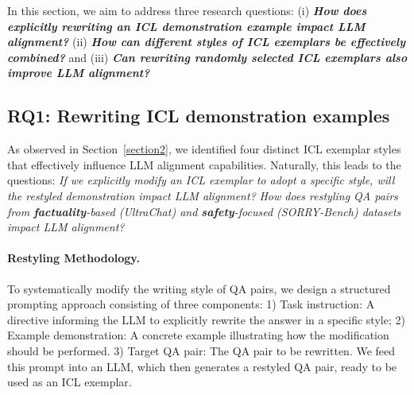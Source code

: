 

%
In this section, we aim to address three research questions: (i) \textbf{\textit{How does explicitly rewriting an ICL demonstration example impact LLM alignment?}} (ii) \textbf{\textit{How can different styles of ICL exemplars be effectively combined?}} and (iii) \textbf{\textit{Can rewriting randomly selected ICL exemplars also improve LLM alignment?}}

\subsection*{RQ1: Rewriting ICL demonstration examples}
\label{ssec:rewrtie_icl}
As observed in Section~\ref{section2}, we identified four distinct ICL exemplar styles that effectively influence LLM alignment capabilities.
Naturally, this leads to the questions: \emph{If we explicitly modify an ICL exemplar to adopt a specific style, will the restyled demonstration impact LLM alignment?}
\emph{How does restyling QA pairs from \textbf{\color{myblue} factuality}-based (UltraChat) and \textbf{\color{myred} safety}-focused (SORRY-Bench) datasets impact LLM alignment?}


\paragraph{Restyling Methodology.}
To systematically modify the writing style of QA pairs, we design a structured prompting approach consisting of three components: 1) Task instruction: A directive informing the LLM to explicitly rewrite the answer in a specific style; 2) Example demonstration: A concrete example illustrating how the modification should be performed. 3) Target QA pair: The QA pair to be rewritten.
We feed this prompt into an LLM, which then generates a restyled QA pair, ready to be used as an ICL exemplar.

